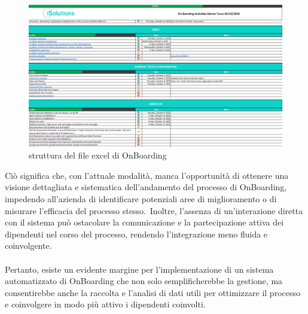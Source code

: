 \begin{figure}[H]
	\centering
	\includegraphics[width=\textwidth]{img/OnBoardingExcel.png}
	\caption{struttura del file excel di OnBoarding}
	\label{fig:OnBoardingExcel}
\end{figure}

Ciò significa che, con l'attuale modalità, manca l'opportunità di ottenere una visione dettagliata e sistematica dell'andamento del processo di OnBoarding, 
impedendo all'azienda di identificare potenziali aree di miglioramento o di misurare l'efficacia del processo stesso.\ 
Inoltre, l'assenza di un'interazione diretta con il sistema può ostacolare la comunicazione e la partecipazione attiva dei dipendenti nel corso 
del processo, rendendo l'integrazione meno fluida e coinvolgente.
\\ \\
Pertanto, esiste un evidente margine per l'implementazione di un sistema automatizzato di OnBoarding che non solo semplificherebbe 
la gestione, ma consentirebbe anche la raccolta e l'analisi di dati utili per ottimizzare il processo e coinvolgere in modo più 
attivo i dipendenti coinvolti.
